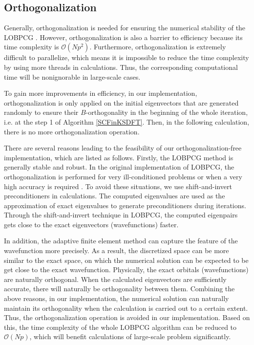 \documentclass[12pt]{article}
\numberwithin{figure}{section}
\numberwithin{table}{section}
\begin{document}
\subsection{Orthogonalization}
Generally, orthogonalization is needed for ensuring the numerical stability of the LOBPCG \cite{hetmaniuk2006basis,duersch2018robust,kressner2023mixed}. However, orthogonalization is also a barrier to efficiency because its time complexity is $\mathcal{O}(Np^2)$. Furthermore, orthogonalization is extremely difficult to parallelize, which means it is impossible to reduce the time complexity by using more threads in calculations. Thus, the corresponding computational time will be nonignorable in large-scale cases. 

To gain more improvements in efficiency, in our implementation, orthogonalization is only applied on the initial eigenvectors that are generated randomly to ensure their $B$-orthogonality in the beginning of the whole iteration, i.e. at the step 1 of Algorithm \ref{SCFinKSDFT}. Then, in the following calculation, there is no more orthogonalization operation. %

There are several reasons leading to the feasibility  of our orthogonalization-free implementation, which are listed as follows. Firstly, the LOBPCG method is generally stable and robust. In the original implementation of LOBPCG, the orthogonalization is performed for very ill-conditioned
problems or when a very high accuracy is required \cite{knyazev2001toward}. To avoid these situations, we use shift-and-invert preconditioners in calculations. The computed eigenvalues are used as the approximation of exact eigenvalues to generate preconditioners during iterations. Through the shift-and-invert technique in LOBPCG, the computed eigenpairs gets close to the exact eigenvectors (wavefunctions) faster. 

In addition, the adaptive finite element method can capture the feature of the wavefunction more precisely. As a result, the discretized space can be more similar to the exact space, on which the numerical solution can be expected to be get close to the exact wavefunction. Physically, the exact orbitals (wavefunctions) are naturally orthogonal. When the calculated eigenvectors are sufficiently accurate, there will naturally be orthogonality between them. Combining the above reasons, in our implementation, the numerical solution can naturally maintain its orthogonality when the calculation is carried out to a certain extent. Thus, the orthogonalization operation is avoided in our implementation. Based on this, the time complexity of the whole LOBPCG algorithm can be reduced to $\mathcal{O}(Np)$, which will benefit calculations of large-scale problem significantly.
\end{document}
